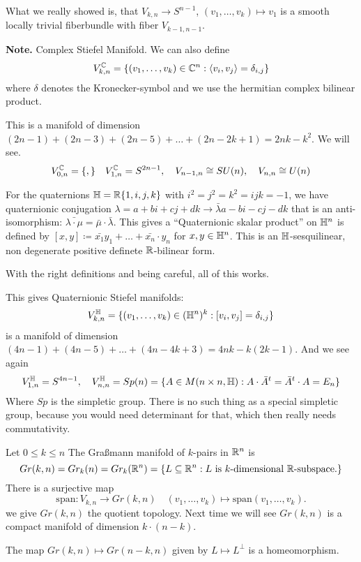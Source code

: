 \documentclass[language=english]{TemplateLecture}
\begin{document}
\begin{remark}
    What we really showed is, that \(V_{k,n} \to S^{n-1}\), \((v_1, \dots, v_k) \mapsto v_1\) is a smooth locally trivial fiberbundle with fiber \(V_{k-1, n-1}\).
\end{remark}

\textbf{Note.} Complex Stiefel Manifold. We can also define
\[V_{k,n}^{\mathbb{C}} = \{(v_1, \dots, v_k) \in \mathbb{C}^n : \langle v_i, v_j\rangle = \delta_{i,j}\}\]
where \(\delta\) denotes the Kronecker-symbol and we use the hermitian complex bilinear product. 

This is a manifold of dimension \((2n-1) + (2n-3) + (2n-5) + \dots + (2n-2k +1) = 2nk - k^2\). We will see.
\[V_{0,n}^\IC = \set *, \quad V_{1,n}^\IC = S^{2n-1}, \quad V_{n-1,n} \cong SU(n), \quad V_{n,n} \cong U(n)\]

For the quaternions \(\mathbb{H} = \mathbb{R}\{1, i,j,k\}\) with \(i^2 = j^2 = k^2 = ijk = -1\), we have quaternionic conjugation \(\lambda = a + bi + cj + dk \to \bar \lambda a- bi - cj - dk\) that is an anti-isomorphism: \(\bar{\lambda \cdot \mu} = \bar \mu \cdot \bar \lambda\). This gives a \enquote{Quaternionic skalar product} on \(\mathbb{H}^n\) is defined by \([x,y] \coloneq \bar{x_1} y_1 + \dots + \bar{x_n} \cdot y_n\) for \(x,y \in \mathbb{H}^n\). This is an \(\mathbb{H}\)-sesquilinear, non degenerate positive definete \(\mathbb{R}\)-bilinear form.

With the right definitions and being careful, all of this works.

This gives Quaternionic Stiefel manifolds:
\[V_{k,n}^{\mathbb{H}} = \{(v_1, \dots, v_k) \in (\mathbb{H}^n)^k : [v_i, v_j] = \delta_{i,j}\}\]
is a manifold of dimension \((4n-1) + (4n-5) + \dots + (4n - 4k +3) = 4nk - k(2k-1)\). And we see again
\[V_{1,n}^{\mathbb{H}} = S^{4n-1}, \quad V_{n,n}^{\mathbb{H}} = Sp(n) = \{A \in M(n\times n, \mathbb{H}) : A\cdot \bar A ^t = \bar A ^t \cdot A = E_n\}\]
Where \(Sp\) is the simpletic group. There is no such thing as a special simpletic group, because you would need determinant for that, which then really needs commutativity.

\begin{construction}
    Let \(0 \leq k \leq n\) The Graßmann manifold of \(k\)-pairs in \(\mathbb{R}^n\) is
    \[Gr(k,n) = Gr_k(n) = Gr_k(\mathbb{R}^n) = \{L \subseteq \mathbb{R}^n : L \text{ is } k\text{-dimensional } \mathbb{R}\text{-subspace.}\}\]
    There is a surjective map
    \[\mathrm{span}\colon V_{k,n} \to Gr(k,n) \quad (v_1, \dots, v_k) \mapsto \mathrm{span}(v_1, \dots, v_k).\]
    we give \(Gr(k,n)\) the quotient topology. Next time we will see \(Gr(k,n)\) is a compact manifold of dimension \(k \cdot (n-k)\).

    The map \(Gr(k,n) \mapsto Gr(n-k,n)\) given by \(L \mapsto L^\perp\) is a homeomorphism.
\end{construction}
\end{document}
